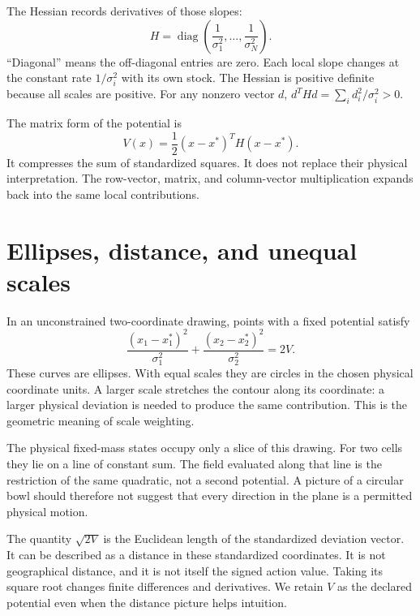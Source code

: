 The Hessian records derivatives of those slopes:
\begin{equation}\label{eq:gaussian-hessian}
 H=\operatorname{diag}\left(\frac1{\sigma_1^2},\ldots,
                            \frac1{\sigma_N^2}\right).
\end{equation}
``Diagonal'' means the off-diagonal entries are zero. Each local slope changes at the constant rate \(1/\sigma_i^2\) with its own stock. The Hessian is positive definite because all scales are positive. For any nonzero vector \(d\), \(d^THd=\sum_i d_i^2/\sigma_i^2>0\).

The matrix form of the potential is
\begin{equation}
 V(x)=\frac12(x-x^*)^TH(x-x^*).
\end{equation}
It compresses the sum of standardized squares. It does not replace their physical interpretation. The row-vector, matrix, and column-vector multiplication expands back into the same local contributions.

\section{Ellipses, distance, and unequal scales}
In an unconstrained two-coordinate drawing, points with a fixed potential satisfy
\begin{equation}
 \frac{(x_1-x_1^*)^2}{\sigma_1^2}
 +\frac{(x_2-x_2^*)^2}{\sigma_2^2}=2V.
\end{equation}
These curves are ellipses. With equal scales they are circles in the chosen physical coordinate units. A larger scale stretches the contour along its coordinate: a larger physical deviation is needed to produce the same contribution. This is the geometric meaning of scale weighting.

The physical fixed-mass states occupy only a slice of this drawing. For two cells they lie on a line of constant sum. The field evaluated along that line is the restriction of the same quadratic, not a second potential. A picture of a circular bowl should therefore not suggest that every direction in the plane is a permitted physical motion.

The quantity \(\sqrt{2V}\) is the Euclidean length of the standardized deviation vector. It can be described as a distance in these standardized coordinates. It is not geographical distance, and it is not itself the signed action value. Taking its square root changes finite differences and derivatives. We retain \(V\) as the declared potential even when the distance picture helps intuition.


